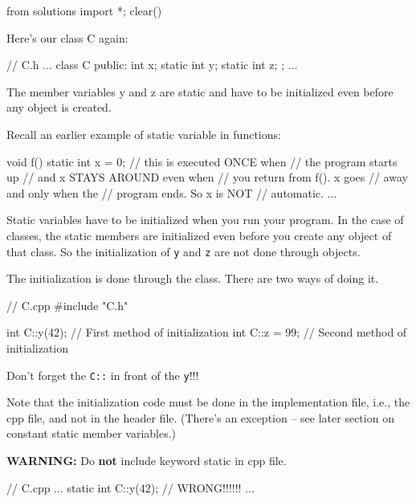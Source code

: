 \begin{python0}
from solutions import *; clear()
\end{python0}

Here's our class C again:

\begin{consolethree}[escapeinside=||]
// C.h
...
class C
{
public:
    int x;
    static int y;
    static int z;
};
...
\end{consolethree}

The member variables y and z are static and have to be initialized even
before any object is created.

Recall an earlier example of static variable in functions:

\begin{consolethree}[escapeinside=||]
void f()
{
    static int x = 0; // this is executed ONCE when
                      // the program starts up
                      // and x STAYS AROUND even when
                      // you return from f(). x goes
                      // away and only when the
                      // program ends. So x is NOT
                      // automatic.
    ...
}
\end{consolethree}

Static variables have to be initialized when you run your program. In
the case of classes, the static members are initialized even before you
create any object of that class. So the initialization of \texttt{y} and
\texttt{z} are not done through objects.

The initialization is done through the class. There are two ways of
doing it.

\begin{consolethree}[escapeinside=||]
// C.cpp
#include "C.h"

int C::y(42);      // First method of initialization
int C::z = 99;     // Second method of initialization
\end{consolethree}

Don't forget the \texttt{C::} in front of the \texttt{y}!!!

Note that the initialization code must be done in the implementation
file, i.e., the cpp file, and not in the header file.
(There's an exception -- see later section on constant
static member variables.)

\textbf{WARNING:} Do \textbf{not} include keyword static in cpp file.

\begin{consolethree}[escapeinside=||]
// C.cpp
...
static int C::y(42); // WRONG!!!!!!
...
\end{consolethree}

